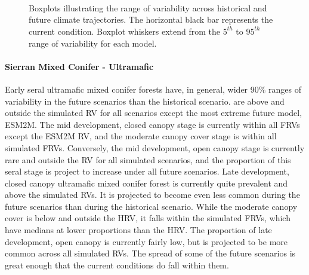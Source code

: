 \begin{figure}[htbp]
  \centering
   \\
   \\
       \\
    \caption{Boxplots illustrating the range of variability across historical and future climate trajectories. The horizontal black bar represents the current condition. Boxplot whiskers extend from the $5^{th}$ to $95^{th}$ range of variability for each model. }
  \label{fig:covcond_megx} 
\end{figure} %


\paragraph{Sierran Mixed Conifer - Ultramafic} Early seral ultramafic mixed conifer forests have, in general, wider 90\% ranges of variability in the future scenarios than the historical scenario. are above and outside the simulated RV for all scenarios except the most extreme future model, ESM2M. The mid development, closed canopy stage is currently within all FRVs except the ESM2M RV, and the moderate canopy cover stage is within all simulated FRVs. Conversely, the mid development, open canopy stage is currently rare and outside the RV for all simulated scenarios, and the proportion of this seral stage is project to increase under all future scenarios. Late development, closed canopy ultramafic mixed conifer forest is currently quite prevalent and above the simulated RVs. It is projected to become even less common during the future scenarios than during the historical scenario. While the moderate canopy cover is below and outside the HRV, it falls within the simulated FRVs, which have medians at lower proportions than the HRV. The proportion of late development, open canopy is currently fairly low, but is projected to be more common across all simulated RVs. The spread of some of the future scenarios is great enough that the current conditions do fall within them. 

